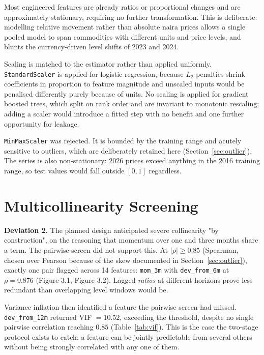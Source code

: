 \documentclass[conference]{IEEEtran}
\begin{document}
Most engineered features are already ratios or proportional changes and are
approximately stationary, requiring no further transformation. This is
deliberate: modelling relative movement rather than absolute naira prices
allows a single pooled model to span commodities with different units and
price levels, and blunts the currency-driven level shifts of 2023 and 2024.

Scaling is matched to the estimator rather than applied uniformly.
\texttt{StandardScaler} is applied for logistic regression, because $L_2$
penalties shrink coefficients in proportion to feature magnitude and unscaled
inputs would be penalised differently purely because of units. No scaling is
applied for gradient boosted trees, which split on rank order and are invariant
to monotonic rescaling; adding a scaler would introduce a fitted step with no
benefit and one further opportunity for leakage.

\texttt{MinMaxScaler} was rejected. It is bounded by the training range and
acutely sensitive to outliers, which are deliberately retained here
(Section~\ref{sec:outlier}). The series is also non-stationary: 2026 prices
exceed anything in the 2016 training range, so test values would fall outside
$[0,1]$ regardless.

\section{Multicollinearity Screening}
\label{sec:collin}

\textbf{Deviation 2.} The planned design anticipated severe collinearity "by
construction", on the reasoning that momentum over one and three months share a
term. The pairwise screen did not support this. At $|\rho| \geq 0.85$
(Spearman, chosen over Pearson because of the skew documented in
Section~\ref{sec:outlier}), exactly one pair flagged across 14 features:
\texttt{mom\_3m} with \texttt{dev\_from\_6m} at $\rho = 0.876$
(Figure 3.1, Figure 3.2). Lagged \emph{ratios} at different horizons prove
less redundant than overlapping level windows would be.

Variance inflation then identified a feature the pairwise screen had missed.
\texttt{dev\_from\_12m} returned VIF $= 10.52$, exceeding the threshold,
despite no single pairwise correlation reaching $0.85$
(Table~\ref{tab:vif}). This is the case the two-stage protocol exists to
catch: a feature can be jointly predictable from several others without being
strongly correlated with any one of them.
\end{document}

